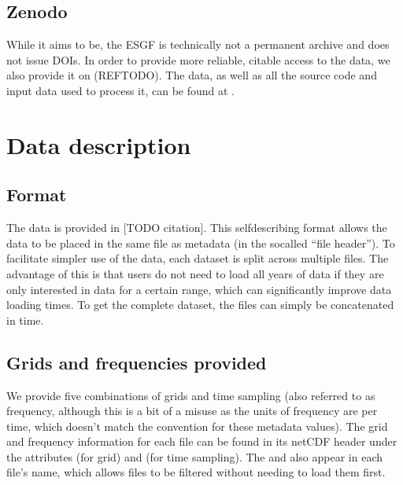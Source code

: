 \documentclass[letterpaper,10pt,english]{jupyterBook}
\begin{document}
\section{Zenodo}
\label{\detokenize{user-guide-historical:zenodo}}
\sphinxAtStartPar
While it aims to be, the ESGF is technically not a permanent archive
and does not issue DOIs.
In order to provide more reliable, citable access to the data,
we also provide it on  (REF\sphinxhyphen{}TODO).
The data, as well as all the source code and input data used to process it,
can be found at .


\chapter{Data description}
\label{\detokenize{user-guide-historical:data-description}}

\section{Format}
\label{\detokenize{user-guide-historical:format}}
\sphinxAtStartPar
The data is provided in  {[}TODO citation{]}.
This self\sphinxhyphen{}describing format allows the data
to be placed in the same file as metadata
(in the so\sphinxhyphen{}called “file header”).
To facilitate simpler use of the data,
each dataset is split across multiple files.
The advantage of this is that users do not need to load all years of data
if they are only interested in data for a certain range,
which can significantly improve data loading times.
To get the complete dataset,
the files can simply be concatenated in time.


\section{Grids and frequencies provided}
\label{\detokenize{user-guide-historical:grids-and-frequencies-provided}}
\sphinxAtStartPar
We provide five combinations of grids and time sampling
(also referred to as frequency,
although this is a bit of a misuse as the units of frequency are per time,
which doesn’t match the convention for these metadata values).
The grid and frequency information for each file can be found in its netCDF header
under the attributes  (for grid) and  (for time sampling).
The  and  also appear in each file’s name,
which allows files to be filtered without needing to load them first.
\end{document}
